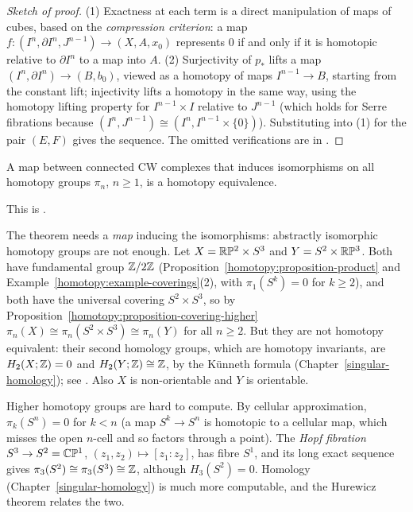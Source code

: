 \begin{proof}[Sketch of proof]
(1) Exactness at each term is a direct manipulation of maps of cubes, based on the \emph{compression criterion}: a map $f \colon (I^n, \partial I^n, J^{n-1}) \to (X, A, x_0)$
represents $0$ if and only if it is homotopic relative to $\partial I^n$ to a map into $A$. (2) Surjectivity of $p_*$ lifts a map $(I^n, \partial I^n) \to (B, b_0)$,
viewed as a homotopy of maps $I^{n-1} \to B$, starting from the constant lift; injectivity lifts a homotopy in the same way, using the homotopy lifting property for
$I^{n-1} \times I$ relative to $J^{n-1}$ (which holds for Serre fibrations because $(I^n, J^{n-1}) \cong (I^n, I^{n-1} \times \{0\})$). Substituting into (1) for the pair
$(E, F)$ gives the sequence. The omitted verifications are in \cite[Theorems 4.3 and 4.41]{hatcher-at}.
\end{proof}

\begin{theorem}[Whitehead]\label{homotopy:theorem-whitehead}
A map between connected CW complexes that induces isomorphisms on all homotopy groups $\pi_n$, $n \geq 1$, is a homotopy equivalence.
\end{theorem}

This is \cite[Theorem 4.5]{hatcher-at}.

\begin{counterexample}\label{homotopy:counterexample-same-homotopy-groups}
The theorem needs a \emph{map} inducing the isomorphisms: abstractly isomorphic homotopy groups are not enough. Let $X = \mathbb{R}\mathbb{P}^2 \times S^3$ and $Y = S^2 \times \mathbb{R}\mathbb{P}^3$. Both have fundamental group
$\mathbb{Z}/2\mathbb{Z}$ (Proposition~\ref{homotopy:proposition-product} and Example~\ref{homotopy:example-coverings}(2), with $\pi_1(S^k) = 0$ for $k \geq 2$), and both have the universal covering $S^2 \times S^3$, so
by Proposition~\ref{homotopy:proposition-covering-higher} $\pi_n(X) \cong \pi_n(S^2 \times S^3) \cong \pi_n(Y)$ for all $n \geq 2$. But they are not homotopy equivalent: their second homology groups,
which are homotopy invariants, are $H_2(X; \mathbb{Z}) = 0$ and $H_2(Y; \mathbb{Z}) \cong \mathbb{Z}$, by the K\"unneth formula (Chapter~\ref{singular-homology}); see \cite[Example 4.35]{hatcher-at}. Also $X$ is
non-orientable and $Y$ is orientable.
\end{counterexample}

\begin{remark}\label{homotopy:remark-higher-computations}
Higher homotopy groups are hard to compute. By cellular approximation, $\pi_k(S^n) = 0$ for $k < n$ (a map $S^k \to S^n$ is homotopic to a cellular map, which misses the
open $n$-cell and so factors through a point). The \emph{Hopf fibration} $S^3 \to S^2 = \mathbb{C}\mathbb{P}^1$, $(z_1, z_2) \mapsto [z_1 : z_2]$, has fibre $S^1$, and its long exact
sequence gives $\pi_3(S^2) \cong \pi_3(S^3) \cong \mathbb{Z}$, although $H_3(S^2) = 0$. Homology (Chapter~\ref{singular-homology}) is much more computable, and the
Hurewicz theorem relates the two.
\end{remark}

